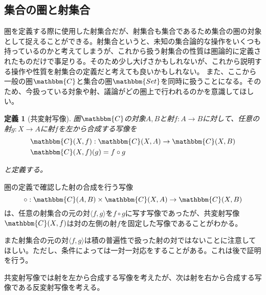 \documentclass[uplatex,dvipdfmx]{jsarticle}
\newcommand{\cat}[1]{\mathbbm{#1}}
\newcommand{\arrow}{\rightarrow}
\newcommand{\tuple}[1]{\langle #1\rangle}
\newcommand{\mor}[3]{#1:#2\arrow #3}
\newcommand{\arset}[3]{\cat{#1}(#2,#3)}
\newtheorem{define}{定義}[section]
\numberwithin{proof}{subsection}
\numberwithin{prop}{subsection}
\numberwithin{define}{subsection}
\begin{document}
  \subsection{集合の圏と射集合}
	圏を定義する際に使用した射集合だが、射集合も集合であるため集合の圏の対象として捉えることができる。射集合というと、未知の集合論的な操作をいくつも持っているのかと考えてしまうが、これから扱う射集合の性質は圏論的に定義されたものだけで事足りる。そのため少し大げさかもしれないが、これから説明する操作や性質を射集合の定義だと考えても良いかもしれない。
  また、ここから一般の圏$\cat{C}$と集合の圏$\cat{Set}$を同時に扱うことになる。そのため、今扱っている対象や射、議論がどの圏上で行われるのかを意識してほしい。

  \begin{define}[共変射写像]
		圏$\cat{C}$の対象$A,B$と射$\mor{f}{A}{B}$に対して、任意の射$\mor{g}{X}{A}$に射$f$を左から合成する写像を
		\begin{align*}
			&\mor{\arset{C}{X}{f}}{\arset{C}{X}{A}}{\arset{C}{X}{B}}\\
			&\arset{C}{X}{f}(g)=f\circ g
		\end{align*}
		\begin{center}
		\end{center}
		と定義する。
	\end{define}
  
  圏の定義で確認した射の合成を行う写像\[\mor{\circ}{\arset{C}{A}{B}\times\arset{C}{X}{A}}{\arset{C}{X}{B}}\]
  は、任意の射集合の元の対$\tuple{f,g}$を$f\circ g$に写す写像であったが、共変射写像$\arset{C}{X}{f}$は対の左側の射$f$を固定した写像であることがわかる。

  また射集合の元の対$\tuple{f,g}$は積の普遍性で扱った射の対ではないことに注意してほしい。ただし、条件によっては一対一対応をすることがある。これは後で証明を行う。

  共変射写像では射を左から合成する写像を考えたが、次は射を右から合成する写像である反変射写像を考える。
\end{document}
